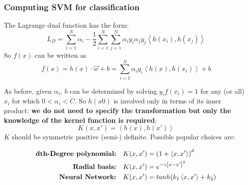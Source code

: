 \documentclass[12pt, letterpaper]{article}
\theoremstyle{definition}
\DeclarePairedDelimiter\autobracket{(}{)}
\newcommand{\br}[1]{\autobracket*{#1}}
\begin{document}
\subsubsection{Computing SVM for classification}
The Lagrange dual function has the form:
\begin{equation}
L_D = \sum_{i=1}^N \alpha_i - \frac{1}{2}\sum_{i=1}^N\sum_{j=1}^N \alpha_i y_i \alpha_j y_j\left\langle  h(x_i), h(x_j)  \right\rangle 
\end{equation}
So $f(x)$ can be written as 
\begin{equation}
f(x) = h(x)\cdot\vec{w} + b = \sum_{i=1}^N \alpha_iy_i \left\langle  h(x), h(x_i)  \right\rangle +b
\end{equation}

As before, given $\alpha_i$, $b$ can be determined by solving $y_i f(x_i) = 1$ for any (or all) $x_i$ for which $0<\alpha_i <C$.
So $h(x0)$ is involved only in terms of its inner product: \textbf{we do not need to specify the transformation but only the knowledge of the kernel function is required}:
\begin{equation}
K(x, x') = \left\langle  h(x), h(x')  \right\rangle
\end{equation}
$K$ should be symmetric positive (semi-) definite.   Possible popular choices are:

\begin{equation}
\begin{aligned}
\textbf{dth-Degree polynomial:} &\quad K(x, x') = \br{1+\left\langle  x,x'  \right\rangle}^d\\
\textbf{Radial basis:} &\quad K(x, x') =e^{-\gamma\left| x-x' \right|^2}\\
\textbf{Neural Network:} &\quad K(x, x') = tanh\br{k_1\left\langle  x,x'  \right\rangle+k_2}\\
\end{aligned}
\end{equation}
\end{document}
